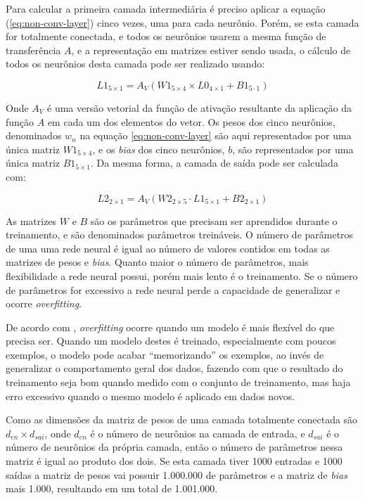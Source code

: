 Para calcular a primeira camada intermediária é preciso aplicar a equação
(\ref{eq:non-conv-layer}) cinco vezes, uma para cada neurônio. Porém, se
esta camada for totalmente conectada, e todos os neurônios usarem a
mesma função de transferência $A$, e a representação em matrizes estiver
sendo usada, o cálculo de todos os neurônios desta camada pode ser
realizado usando:

\begin{equation}
	L1_{5 \times 1}=A_V \left( W1_{5 \times 4} \times L0_{4 \times 1}
		+ B1_{5 \cdot 1} \right)
\end{equation}

Onde $A_V$ é uma versão vetorial da função de ativação resultante
da aplicação da função $A$ em cada um dos elementos do vetor.
Os pesos dos cinco neurônios, denominados $w_n$ na equação
\ref{eq:non-conv-layer} são aqui representados por uma única matriz
$W1_{5 \times 4}$, e os \emph{bias} dos cinco neurônios, $b$, são representados
por uma única matriz $B1_{5 \times 1}$. Da mesma forma, a camada de saída
pode ser calculada com:

\begin{equation}
	L2_{2 \times 1}=A_V \left( W2_{2 \times 5} \cdot L1_{5 \times 1}
		+ B2_{2 \times 1} \right)
\end{equation}

As matrizes $W$ e $B$ são os parâmetros que precisam ser aprendidos durante o
treinamento, e são denominados parâmetros treináveis. O número de parâmetros
de uma uma
rede neural é igual ao número de valores contidos em todas as matrizes de pesos
e \emph{bias}. Quanto maior o número de parâmetros, mais flexibilidade a rede
neural possui, porém mais lento é o treinamento. Se o número de parâmetros for
excessivo a rede neural perde a capacidade de generalizar e ocorre
\emph{overfitting}.

De acordo com \cite{hawkins2004problem}, \emph{overfitting} ocorre quando um
modelo é mais flexível do que precisa ser. Quando um modelo destes é treinado,
especialmente com poucos exemplos, o modelo pode acabar ``memorizando'' os
exemplos, ao invés de generalizar o comportamento geral dos dados, fazendo
com que o resultado do treinamento seja bom quando medido com o conjunto de
treinamento, mas haja erro excessivo quando o mesmo modelo é aplicado em
dados novos.

Como as dimensões da matriz de pesos de uma camada totalmente conectada são
$d_{en} \times d_{sai}$, onde $d_{en}$ é o número de neurônios na camada de
entrada, e $d_{sai}$ é o número de neurônios da própria camada, então o número
de parâmetros nessa matriz é igual ao produto dos dois. Se esta camada
tiver 1000 entradas e 1000 saídas a matriz de pesos vai possuir 1.000.000 de
parâmetros e a matriz de \emph{bias} mais 1.000, resultando em um total de
1.001.000.

